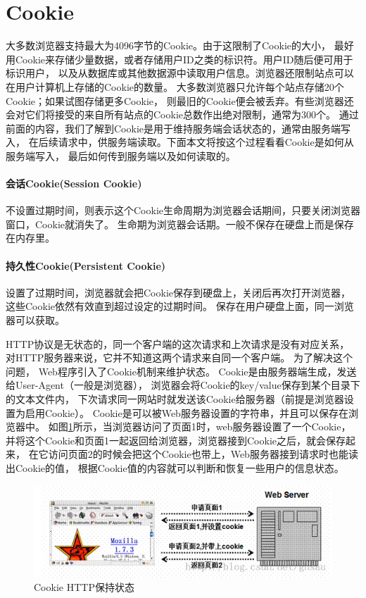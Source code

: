 \documentclass{book}
\begin{document}
\section{Cookie}

大多数浏览器支持最大为4096字节的Cookie。由于这限制了Cookie的大小，
最好用Cookie来存储少量数据，或者存储用户ID之类的标识符。用户ID随后便可用于标识用户，
以及从数据库或其他数据源中读取用户信息。浏览器还限制站点可以在用户计算机上存储的Cookie的数量。
大多数浏览器只允许每个站点存储20个Cookie；如果试图存储更多Cookie，
则最旧的Cookie便会被丢弃。有些浏览器还会对它们将接受的来自所有站点的Cookie总数作出绝对限制，通常为300个。
通过前面的内容，我们了解到Cookie是用于维持服务端会话状态的，通常由服务端写入，
在后续请求中，供服务端读取。下面本文将按这个过程看看Cookie是如何从服务端写入，
最后如何传到服务端以及如何读取的。 

\paragraph{会话Cookie(Session Cookie)}

不设置过期时间，则表示这个Cookie生命周期为浏览器会话期间，只要关闭浏览器窗口，Cookie就消失了。
生命期为浏览器会话期。一般不保存在硬盘上而是保存在内存里。

\paragraph{持久性Cookie(Persistent Cookie)}

设置了过期时间，浏览器就会把Cookie保存到硬盘上，关闭后再次打开浏览器，
这些Cookie依然有效直到超过设定的过期时间。
保存在用户硬盘上面，同一浏览器可以获取。

HTTP协议是无状态的，同一个客户端的这次请求和上次请求是没有对应关系，
对HTTP服务器来说，它并不知道这两个请求来自同一个客户端。 
为了解决这个问题， Web程序引入了Cookie机制来维护状态。
Cookie是由服务器端生成，发送给User-Agent（一般是浏览器），
浏览器会将Cookie的key/value保存到某个目录下的文本文件内，
下次请求同一网站时就发送该Cookie给服务器（前提是浏览器设置为启用Cookie）。
Cookie是可以被Web服务器设置的字符串，并且可以保存在浏览器中。
如图\ref{fig:CookieKeepStatus}所示，当浏览器访问了页面1时，web服务器设置了一个Cookie，
并将这个Cookie和页面1一起返回给浏览器，浏览器接到Cookie之后，就会保存起来，
在它访问页面2的时候会把这个Cookie也带上，Web服务器接到请求时也能读出Cookie的值，
根据Cookie值的内容就可以判断和恢复一些用户的信息状态。

\begin{figure}[htbp]
	\centering
	\includegraphics[scale=0.8]{CookieKeepStatus.jpg}
	\caption{Cookie HTTP保持状态}
	\label{fig:CookieKeepStatus}
\end{figure}
\end{document}
